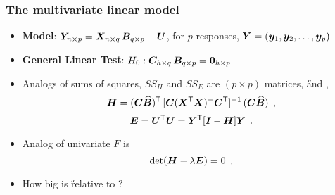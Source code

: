 \begin{frame}
  \frametitle{The multivariate linear model}
   \begin{itemize}
	\item {\bfseries Model}: $\bm{Y}_{n \times p} = \bm{X}_{n \times q} \, \bm{B}_{q \times p} + \bm{U}$, for $p$ responses, $\bm{Y} = (\bm{y}_1 , \bm{y}_2, \dots , \bm{y}_p )$
	  \item {\bfseries General Linear Test}: $H_0 : \bm{C}_{h \times q} \, \bm{B}_{q \times p} = \bm{0}_{h \times p}$
	  \item Analogs of sums of squares, $SS_H$ and $SS_E$ are $(p \times p)$ matrices, \H and \E,
\begin{equation*}%
\mat{H}  =
 (\mat{C} \widehat{\mat{B}})\trans \,
 [\mat{C} (\mat{X}\trans \mat{X} )^{-} \mat{C}\trans]^{-1} \,
 (\mat{C} \widehat{\mat{B}})
 \comma
\end{equation*}
\begin{equation*}%
\mat{E}  = \mat{U}\trans \mat{U} =
 \mat{Y}\trans
 [\mat{I} - \mat{H}]
 \mat{Y}
 \period
\end{equation*}
	\item Analog of univariate $F$ is
\begin{equation*}%
 \det{ \mat{H} - \lambda \mat{E} } = 0
 \comma
\end{equation*}
	\item How big is \H relative to \E ?
  \end{itemize}
\end{frame}

